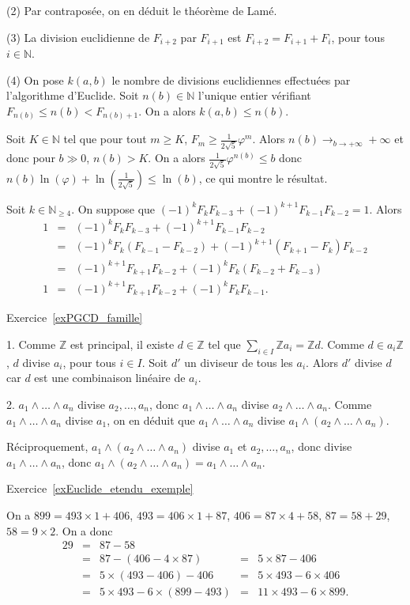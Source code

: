 \documentclass[11pt,a4paper]{article}
\newcommand{\N}{\mathbb{N}}
\newcommand{\Z}{\mathbb{Z}}
\begin{document}
(2) Par contraposée, on en déduit le théorème de Lamé.

(3) La division euclidienne de $F_{i+2}$ par $F_{i+1}$ est $F_{i+2}=F_{i+1}+F_i$, pour tous $i\in \N$. 

(4) On pose $k(a,b)$ le nombre de divisions euclidiennes effectuées par l'algorithme d'Euclide. Soit $n(b)\in \N$ l'unique entier vérifiant $F_{n(b)}\leq n(b)<F_{n(b)+1}$. On a alors $k(a,b)\leq n(b)$. 

Soit $K\in \N$ tel que pour tout $m\geq K$, $F_m\geq \frac{1}{2\sqrt{5}}\varphi^{m}$. Alors $n(b)\rightarrow_{b\rightarrow +\infty} +\infty$ et donc pour $b\gg 0$, $n(b) >K$. On a alors $\frac{1}{2\sqrt{5}} \varphi^{n(b)}\leq b$ donc $n(b)\ln(\varphi)+\ln(\frac{1}{2\sqrt{5}})\leq \ln(b)$, ce qui montre le résultat.

Soit $k\in \N_{\geq 4}$. On suppose que $(-1)^k F_k F_{k-3} +(-1)^{k+1} F_{k-1} F_{k-2}=1$. Alors \[\begin{aligned} 1 &=& (-1)^k F_k F_{k-3} +(-1)^{k+1} F_{k-1} F_{k-2} \\
&=& (-1)^k F_k (F_{k-1}-F_{k-2})+(-1)^{k+1} (F_{k+1}-F_k) F_{k-2}\\
&=& (-1)^{k+1} F_{k+1} F_{k-2}+(-1)^k F_k(F_{k-2}+F_{k-3})\\
1 &=& (-1)^{k+1} F_{k+1} F_{k-2} + (-1)^k F_kF_{k-1}.\end{aligned}\]

Exercice~\ref{exPGCD_famille}

1. Comme $\Z$ est principal, il existe $d\in \Z$ tel que $\sum_{i\in I} \Z a_i=\Z d$. Comme $d\in a_i\Z$, $d$ divise $a_i$, pour tous $i\in I$. Soit $d'$ un diviseur de tous les $a_i$. Alors $d'$ divise $d$ car $d$ est une combinaison linéaire de $a_i$.

2. $a_1\wedge \ldots \wedge a_n$ divise  $a_2,\ldots, a_n$, donc $a_1\wedge \ldots \wedge a_n$ divise $a_2\wedge \ldots \wedge a_n$. Comme $a_1\wedge \ldots \wedge a_n$ divise $a_1$, on en déduit que $a_1\wedge \ldots \wedge a_n$ divise $a_1\wedge (a_2\wedge \ldots \wedge a_n)$. 

Réciproquement, $a_1\wedge (a_2\wedge \ldots\wedge a_n)$ divise $a_1$ et $a_2,\ldots,a_n$, donc divise $a_1\wedge\ldots \wedge a_n$, donc $a_1\wedge (a_2\wedge \ldots\wedge a_n)=a_1\wedge\ldots\wedge a_n$.

Exercice~\ref{exEuclide_etendu_exemple}

On a  $899 = 493\times 1+406$, $493=406\times 1+87$, $406=87\times 4+58$, $87=58+29$, $58=9\times 2$. On a donc \[\begin{aligned} 29 &=& 87-58\\
 &=& 87-(406-4\times 87) &=& 5\times 87-406\\
 &=& 5\times (493-406)-406 &=& 5\times 493-6\times 406\\
 &=& 5\times 493-6\times (899-493) &=& 11\times 493-6\times 899.\end{aligned}\]
 
\end{document}
